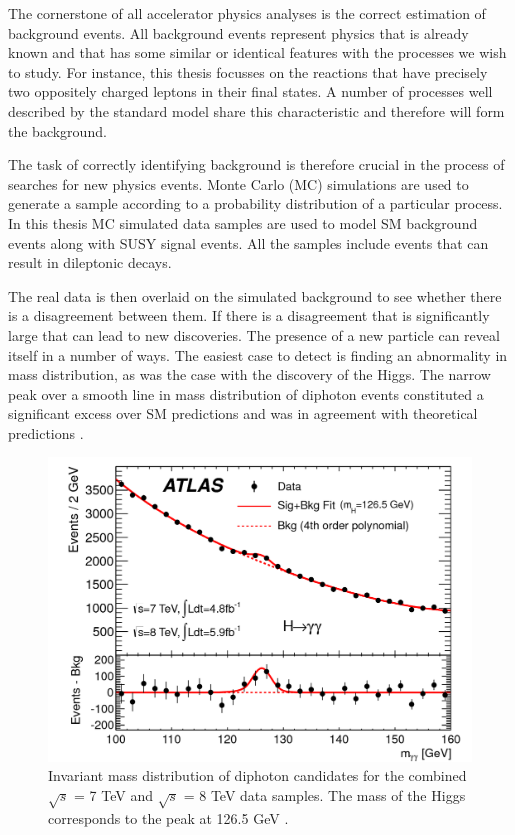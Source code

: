 The cornerstone of all accelerator physics analyses is the correct estimation of background events. All background events represent physics that is already known and that has some similar or identical features with the processes we wish to study. For instance, this thesis focusses on the  reactions that have precisely two oppositely charged leptons in their final states. A number of processes well described by the standard model share this characteristic and therefore will form the background. 

The task of correctly identifying background is therefore crucial in the process of searches for new physics events. Monte Carlo (MC) simulations are used to generate a sample according to a probability distribution of a particular process. In this thesis MC simulated data samples are used to model SM background events along with SUSY signal events. All the samples include events that can result in dileptonic decays. 

The real data is then overlaid on the simulated background to see whether there is a disagreement between them. If there is a disagreement that is significantly large that can lead to new discoveries. The presence of a new particle can reveal itself in a number of ways. The easiest case to detect is finding an abnormality in mass distribution, as was the case with the discovery of the Higgs. The narrow peak over a smooth line in mass distribution of diphoton events constituted a significant excess over SM predictions and was in agreement with theoretical predictions \citep{chatrchyan2012observation,Aad:2012tfa}. 

\begin{figure}
	\centering
	\captionsetup{width=0.8\textwidth}
	\includegraphics[scale=0.2]{Chap3/figaux_004a}
	\caption[width=0.8\textwidth]{Invariant mass distribution of diphoton 				candidates for the combined $\sqrt{s}$ = 7 TeV and $\sqrt{s}$ = 8 TeV 			data samples. The mass of the Higgs corresponds to the peak at 126.5 				GeV \citep{Aad:2012tfa}.}
\end{figure}

